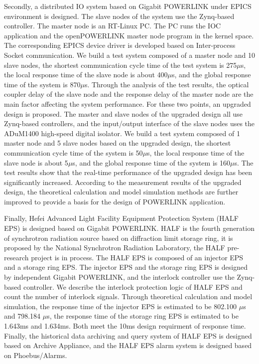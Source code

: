 \begin{enabstract}
Secondly, a distributed IO system based on Gigabit POWERLINK under EPICS environment is designed. The slave nodes of the system use the Zynq-based controller. The master node is an RT-Linux PC. The PC runs the IOC application and the openPOWERLINK master node program in the kernel space. The corresponding EPICS device driver is developed based on Inter-process Socket communication. We build a test system composed of a master node and 10 slave nodes, the shortest communication cycle time of the test system is 275$\mu$s, the local response time of the slave node is about 400$\mu$s, and the global response time of the system is 870$\mu$s. Through the analysis of the test results, the optical coupler delay of the slave node and the response delay of the master node are the main factor affecting the system performance. For these two points, an upgraded design is proposed. The master and slave nodes of the upgraded design all use Zynq-based controllers, and the input/output interface of the slave nodes uses the ADuM1400 high-speed digital isolator. We build a test system composed of 1 master node and 5 slave nodes based on the upgraded design, the shortest communication cycle time of the system is 50$\mu$s, the local response time of the slave node is about 5$\mu$s, and the global response time of the system is 160$\mu$s. The test results show that the real-time performance of the upgraded design has been significantly increased. According to the measurement results of the upgraded design, the theoretical calculation and model simulation methods are further improved to provide a basis for the design of POWERLINK application.

Finally, Hefei Advanced Light Facility Equipment Protection System (HALF EPS) is designed based on Gigabit POWERLINK. HALF is the fourth generation of synchrotron radiation source based on diffraction limit storage ring, it is proposed by the National Synchrotron Radiation Laboratory, the HALF pre-research project is in process. The HALF EPS is composed of an injector EPS and a storage ring EPS. The injector EPS and the storage ring EPS is designed by independent Gigabit POWERLINK, and the interlock controller use the Zynq-based controller. We describe the interlock protection logic of HALF EPS and count the number of interlock signals. Through theoretical calculation and model simulation, the response time of the injector EPS is estimated to be 802.100 $\mu$s and 798.184 $\mu$s, the response time of the storage ring EPS is estimated to be 1.643ms and 1.634ms. Both meet the 10ms design requirment of response time. Finally, the historical data archiving and query system of HALF EPS is designed based on Archive Appliance, and the HALF EPS alarm system is designed based on Phoebus/Alarms.

\end{enabstract}
